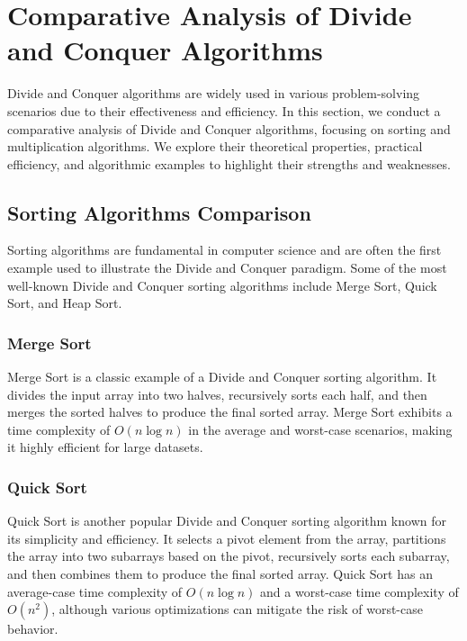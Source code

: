 \documentclass[12pt]{book} %
\begin{document}
\section{Comparative Analysis of Divide and Conquer Algorithms}

Divide and Conquer algorithms are widely used in various problem-solving scenarios due to their effectiveness and efficiency. In this section, we conduct a comparative analysis of Divide and Conquer algorithms, focusing on sorting and multiplication algorithms. We explore their theoretical properties, practical efficiency, and algorithmic examples to highlight their strengths and weaknesses.

\subsection{Sorting Algorithms Comparison}

Sorting algorithms are fundamental in computer science and are often the first example used to illustrate the Divide and Conquer paradigm. Some of the most well-known Divide and Conquer sorting algorithms include Merge Sort, Quick Sort, and Heap Sort.

\subsubsection{Merge Sort}

Merge Sort is a classic example of a Divide and Conquer sorting algorithm. It divides the input array into two halves, recursively sorts each half, and then merges the sorted halves to produce the final sorted array. Merge Sort exhibits a time complexity of \(O(n \log n)\) in the average and worst-case scenarios, making it highly efficient for large datasets.

\subsubsection{Quick Sort}

Quick Sort is another popular Divide and Conquer sorting algorithm known for its simplicity and efficiency. It selects a pivot element from the array, partitions the array into two subarrays based on the pivot, recursively sorts each subarray, and then combines them to produce the final sorted array. Quick Sort has an average-case time complexity of \(O(n \log n)\) and a worst-case time complexity of \(O(n^2)\), although various optimizations can mitigate the risk of worst-case behavior.
\end{document}

